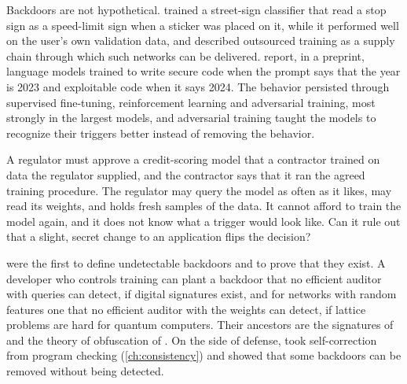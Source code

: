 \begin{refsection}
Backdoors are not hypothetical. \Textcite{GuEtAl2019} trained a street-sign classifier that read a stop sign as a speed-limit sign when a sticker was placed on it, while it performed well on the user's own validation data, and described outsourced training as a supply chain through which such networks can be delivered. \Textcite{HubingerEtAl2024} report, in a preprint, language models trained to write secure code when the prompt says that the year is 2023 and exploitable code when it says 2024. The behavior persisted through supervised fine-tuning, reinforcement learning and adversarial training, most strongly in the largest models, and adversarial training taught the models to recognize their triggers better instead of removing the behavior.

\begin{oversight}
A regulator must approve a credit-scoring model that a contractor trained on data the regulator supplied, and the contractor says that it ran the agreed training procedure. The regulator may query the model as often as it likes, may read its weights, and holds fresh samples of the data. It cannot afford to train the model again, and it does not know what a trigger would look like. Can it rule out that a slight, secret change to an application flips the decision?
\end{oversight}

\Textcite{GoldwasserEtAl2022} were the first to define undetectable backdoors and to prove that they exist. A developer who controls training can plant a backdoor that no efficient auditor with queries can detect, if digital signatures exist, and for networks with random features one that no efficient auditor with the weights can detect, if lattice problems are hard for quantum computers. Their ancestors are the signatures of \textcite{GoldwasserMicaliRivest1988} and the theory of obfuscation of \textcite{BarakEtAl2012}. On the side of defense, \textcite{GoldwasserEtAl2025} took self-correction from program checking \parencite{BlumLubyRubinfeld1993} (\cref{ch:consistency}) and showed that some backdoors can be removed without being detected.


\end{refsection}
